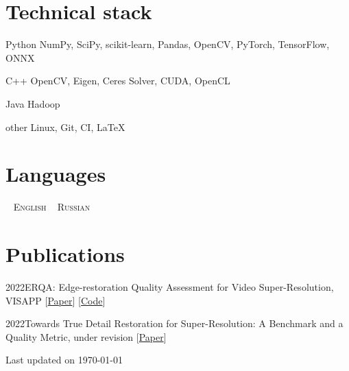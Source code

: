\documentclass{tccv}
\newcommand{\updateinfo}[1][\today]{\par\vfill\hfill{\scriptsize\color{darkergray}Last updated on #1}}
\begin{document}
\section{Technical stack}

\begin{factlist}

\item{Python}
     {NumPy, SciPy, scikit-learn, Pandas, OpenCV, PyTorch, TensorFlow, ONNX}

\item{C++}
     {OpenCV, Eigen, Ceres Solver, CUDA, OpenCL}

\item{Java}
     {Hadoop}

\item{other}
     {Linux, Git, CI, \LaTeX}

\end{factlist}


\section{Languages}

\faAngleDoubleRight~ \textsc{English}\qquad
\faAngleDoubleRight~ \textsc{Russian}

\section{Publications}

\begin{factlist}
     \item{2022}{ERQA: Edge-restoration Quality Assessment for Video Super-Resolution, VISAPP [\href{https://arxiv.org/abs/2110.09992}{Paper}] [\href{https://github.com/msu-video-group/ERQA}{Code}]}
     \item{2022}{Towards True Detail Restoration for Super-Resolution: A Benchmark and a Quality Metric, under revision [\href{https://arxiv.org/abs/2203.08923}{Paper}]}
\end{factlist}

\updateinfo
\end{document}
